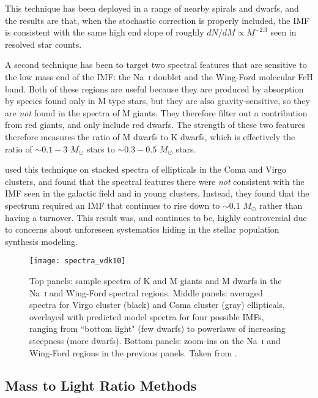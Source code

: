 This technique has been deployed in a range of nearby spirals and dwarfs, and the results are that, when the stochastic correction is properly included, the IMF is consistent with the same high end slope of roughly $dN/dM\propto M^{-2.3}$ seen in resolved star counts.

A second technique has been to target two spectral features that are sensitive to the low mass end of the IMF: the Na~\textsc{i} doublet and the Wing-Ford molecular FeH band. Both of these regions are useful because they are produced by absorption by species found only in M type stars, but they are also gravity-sensitive, so they are \textit{not} found in the spectra of M giants. They therefore filter out a contribution from red giants, and only include red dwarfs. The strength of these two features therefore measures the ratio of M dwarfs to K dwarfs, which is effectively the ratio of $\sim 0.1-3$ $M_\odot$ stars to $\sim 0.3-0.5$ $M_\odot$ stars.

\citet{van-dokkum10a} used this technique on stacked spectra of ellipticals in the Coma and Virgo clusters, and found that the spectral features there were \textit{not} consistent with the IMF seen in the galactic field and in young clusters. Instead, they found that the spectrum required an IMF that continues to rise down to $\sim 0.1$ $M_\odot$ rather than having a turnover. This result was, and continues to be, highly controversial due to concerns about unforeseen systematics hiding in the stellar population synthesis modeling.

\begin{figure}
\texttt{[image: spectra\_vdk10]}
\caption[Elliptical galaxy spectra in the Na~\textsc{i} and Wing-Ford regions]{
\label{fig:spectra_vdk10}
Top panels: sample spectra of K and M giants and M dwarfs in the Na~\textsc{i} and Wing-Ford spectral regions. Middle panels: averaged spectra for Virgo cluster (black) and Coma cluster (gray) ellipticals, overlayed with predicted model spectra for four possible IMFs, ranging from ``bottom light" (few dwarfs) to powerlaws of increasing steepness (more dwarfs). Bottom panels: zoom-ins on the Na~\textsc{i} and Wing-Ford regions in the previous panels. Taken from \citet{van-dokkum10a}.
}
\end{figure}

\subsection{Mass to Light Ratio Methods}

